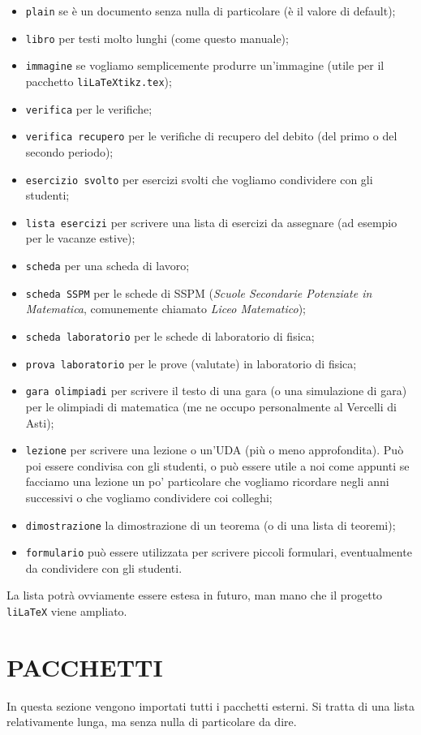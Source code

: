 \documentclass[italian, a4paper]{article}
\newcommand{\ttt}[1]{\texttt{#1}}
\begin{document}
\begin{itemize}[nolistsep]
\item \ttt{plain} se è un documento senza nulla di particolare (è il valore di default);
\item \ttt{libro} per testi molto lunghi (come questo manuale);
\item \ttt{immagine} se vogliamo semplicemente produrre un'immagine (utile per il pacchetto \ttt{liLaTeXtikz.tex});
\item \ttt{verifica} per le verifiche;
\item \ttt{verifica recupero} per le verifiche di recupero del debito (del primo o del secondo periodo);
\item \ttt{esercizio svolto} per esercizi svolti che vogliamo condividere con gli studenti;
\item \ttt{lista esercizi} per scrivere una lista di esercizi da assegnare (ad esempio per le vacanze estive);
\item \ttt{scheda} per una scheda di lavoro;
\item \ttt{scheda SSPM} per le schede di SSPM (\textit{Scuole Secondarie Potenziate in Matematica}, comunemente chiamato \textit{Liceo Matematico});
\item \ttt{scheda laboratorio} per le schede di laboratorio di fisica;
\item \ttt{prova laboratorio} per le prove (valutate) in laboratorio di fisica;
\item \ttt{gara olimpiadi} per scrivere il testo di una gara (o una simulazione di gara) per le olimpiadi di matematica (me ne occupo personalmente al Vercelli di Asti);
\item \ttt{lezione} per scrivere una lezione o un'UDA (più o meno approfondita). Può poi essere condivisa con gli studenti, o può essere utile a noi come appunti se facciamo una lezione un po' particolare che vogliamo ricordare negli anni successivi o che vogliamo condividere coi colleghi;
\item \ttt{dimostrazione} la dimostrazione di un teorema (o di una lista di teoremi);
\item \ttt{formulario} può essere utilizzata per scrivere piccoli formulari, eventualmente da condividere con gli studenti.
\end{itemize}
La lista potrà ovviamente essere estesa in futuro, man mano che il progetto \ttt{liLaTeX} viene ampliato.

\section{PACCHETTI}
In questa sezione vengono importati tutti i pacchetti esterni. Si tratta di una lista relativamente lunga, ma senza nulla di particolare da dire.
\end{document}
